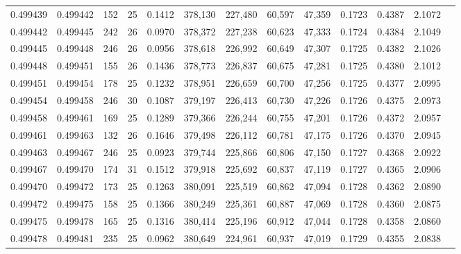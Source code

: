 \begin{tabular}{rrrrrrrrrrrrr}
0.499439 & 0.499442 & 152 &  25 &                                     0.1412 & 378,130 & 227,480 &  60,597 &  47,359 & 0.1723 & 0.4387 & 2.1072 \\
0.499442 & 0.499445 & 242 &  26 &                                     0.0970 & 378,372 & 227,238 &  60,623 &  47,333 & 0.1724 & 0.4384 & 2.1049 \\
0.499445 & 0.499448 & 246 &  26 &                                     0.0956 & 378,618 & 226,992 &  60,649 &  47,307 & 0.1725 & 0.4382 & 2.1026 \\
0.499448 & 0.499451 & 155 &  26 &                                     0.1436 & 378,773 & 226,837 &  60,675 &  47,281 & 0.1725 & 0.4380 & 2.1012 \\
0.499451 & 0.499454 & 178 &  25 &                                     0.1232 & 378,951 & 226,659 &  60,700 &  47,256 & 0.1725 & 0.4377 & 2.0995 \\
0.499454 & 0.499458 & 246 &  30 &                                     0.1087 & 379,197 & 226,413 &  60,730 &  47,226 & 0.1726 & 0.4375 & 2.0973 \\
0.499458 & 0.499461 & 169 &  25 &                                     0.1289 & 379,366 & 226,244 &  60,755 &  47,201 & 0.1726 & 0.4372 & 2.0957 \\
0.499461 & 0.499463 & 132 &  26 &                                     0.1646 & 379,498 & 226,112 &  60,781 &  47,175 & 0.1726 & 0.4370 & 2.0945 \\
0.499463 & 0.499467 & 246 &  25 &                                     0.0923 & 379,744 & 225,866 &  60,806 &  47,150 & 0.1727 & 0.4368 & 2.0922 \\
0.499467 & 0.499470 & 174 &  31 &                                     0.1512 & 379,918 & 225,692 &  60,837 &  47,119 & 0.1727 & 0.4365 & 2.0906 \\
0.499470 & 0.499472 & 173 &  25 &                                     0.1263 & 380,091 & 225,519 &  60,862 &  47,094 & 0.1728 & 0.4362 & 2.0890 \\
0.499472 & 0.499475 & 158 &  25 &                                     0.1366 & 380,249 & 225,361 &  60,887 &  47,069 & 0.1728 & 0.4360 & 2.0875 \\
0.499475 & 0.499478 & 165 &  25 &                                     0.1316 & 380,414 & 225,196 &  60,912 &  47,044 & 0.1728 & 0.4358 & 2.0860 \\
0.499478 & 0.499481 & 235 &  25 &                                     0.0962 & 380,649 & 224,961 &  60,937 &  47,019 & 0.1729 & 0.4355 & 2.0838 \\

\end{tabular}
